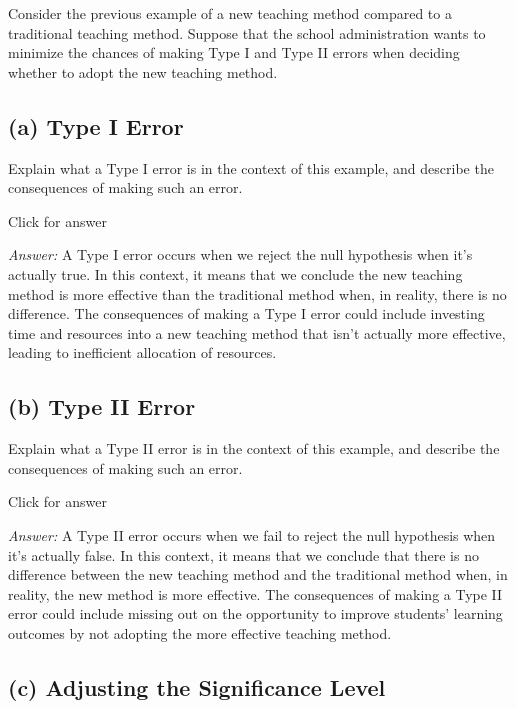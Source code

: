 \documentclass[
]{book}
\begin{document}
Consider the previous example of a new teaching method compared to a traditional teaching method. Suppose that the school administration wants to minimize the chances of making Type I and Type II errors when deciding whether to adopt the new teaching method.

\hypertarget{a-type-i-error}{%
\subsection{(a) Type I Error}\label{a-type-i-error}}

Explain what a Type I error is in the context of this example, and describe the consequences of making such an error.

Click for answer

\emph{Answer:} A Type I error occurs when we reject the null hypothesis when it's actually true. In this context, it means that we conclude the new teaching method is more effective than the traditional method when, in reality, there is no difference. The consequences of making a Type I error could include investing time and resources into a new teaching method that isn't actually more effective, leading to inefficient allocation of resources.

\hypertarget{b-type-ii-error}{%
\subsection{(b) Type II Error}\label{b-type-ii-error}}

Explain what a Type II error is in the context of this example, and describe the consequences of making such an error.

Click for answer

\emph{Answer:} A Type II error occurs when we fail to reject the null hypothesis when it's actually false. In this context, it means that we conclude that there is no difference between the new teaching method and the traditional method when, in reality, the new method is more effective. The consequences of making a Type II error could include missing out on the opportunity to improve students' learning outcomes by not adopting the more effective teaching method.

\hypertarget{c-adjusting-the-significance-level}{%
\subsection{(c) Adjusting the Significance Level}\label{c-adjusting-the-significance-level}}
\end{document}
